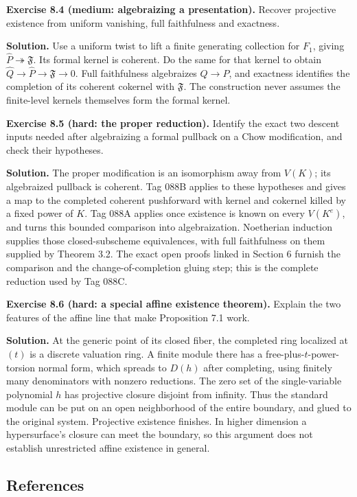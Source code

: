 \documentclass[11pt]{article}
\begin{document}
\textbf{Exercise 8.4 (medium: algebraizing a presentation).} Recover
projective existence from uniform vanishing, full faithfulness and
exactness.

\textbf{Solution.} Use a uniform twist to lift a finite generating
collection for \(F_1\), giving
\(\widehat P\twoheadrightarrow\mathfrak F\). Its formal kernel is
coherent. Do the same for that kernel to obtain
\(\widehat Q\to\widehat P\to\mathfrak F\to0\). Full faithfulness
algebraizes \(Q\to P\), and exactness identifies the completion of its
coherent cokernel with \(\mathfrak F\). The construction never assumes
the finite-level kernels themselves form the formal kernel.

\textbf{Exercise 8.5 (hard: the proper reduction).} Identify the exact
two descent inputs needed after algebraizing a formal pullback on a Chow
modification, and check their hypotheses.

\textbf{Solution.} The proper modification is an isomorphism away from
\(V(K)\); its algebraized pullback is coherent. Tag 088B applies to
these hypotheses and gives a map to the completed coherent pushforward
with kernel and cokernel killed by a fixed power of \(K\). Tag 088A
applies once existence is known on every \(V(K^e)\), and turns this
bounded comparison into algebraization. Noetherian induction supplies
those closed-subscheme equivalences, with full faithfulness on them
supplied by Theorem 3.2. The exact open proofs linked in Section 6
furnish the comparison and the change-of-completion gluing step; this is
the complete reduction used by Tag 088C.

\textbf{Exercise 8.6 (hard: a special affine existence theorem).}
Explain the two features of the affine line that make Proposition 7.1
work.

\textbf{Solution.} At the generic point of its closed fiber, the
completed ring localized at \((t)\) is a discrete valuation ring. A
finite module there has a free-plus-\(t\)-power-torsion normal form,
which spreads to \(D(h)\) after completing, using finitely many
denominators with nonzero reductions. The zero set of the
single-variable polynomial \(h\) has projective closure disjoint from
infinity. Thus the standard module can be put on an open neighborhood of
the entire boundary, and glued to the original system. Projective
existence finishes. In higher dimension a hypersurface's closure can
meet the boundary, so this argument does not establish unrestricted
affine existence in general.

\subsection{References}\label{references}
\end{document}
